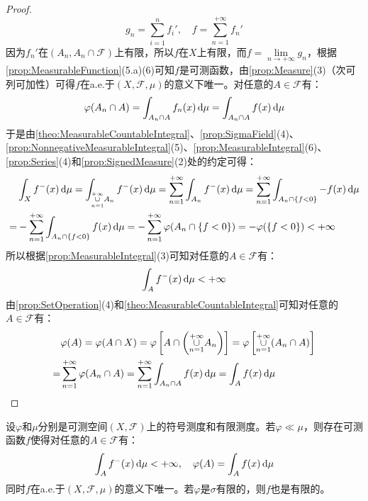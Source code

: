\begin{proof}
\begin{equation*}
		g_n=\sum_{i=1}^{n}f_i',\quad f=\sum_{n=1}^{+\infty}f_n'
	\end{equation*}
	因为$f_n'$在$(A_n,A_n\cap\mathscr{F})$上有限，所以$f$在$X$上有限，而$f=\lim\limits_{n\to+\infty}g_n$，根据\cref{prop:MeasurableFunction}(5.a)(6)可知$f$是可测函数，由\cref{prop:Measure}(3)（次可列可加性）可得$f$在a.e.于$(X,\mathscr{F},\mu)$的意义下唯一。对任意的$A\in\mathscr{F}$有：
	\begin{equation*}
		\varphi(A_n\cap A)=\int_{A_n\cap A}f_n(x)\mathop{}\!\mathrm{d}\mu=\int_{A_n\cap A}f(x)\mathop{}\!\mathrm{d}\mu
	\end{equation*}
	于是由\cref{theo:MeasurableCountableIntegral}、\cref{prop:SigmaField}(4)、\cref{prop:NonnegativeMeasurableIntegral}(5)、\cref{prop:MeasurableIntegral}(6)、\cref{prop:Series}(4)和\cref{prop:SignedMeasure}(2)处的约定可得：
	\begin{align*}
		&\int_{X}f^-(x)\mathop{}\!\mathrm{d}\mu=\int_{\underset{n=1}{\overset{+\infty}{\cup}}A_n}f^-(x)\mathop{}\!\mathrm{d}\mu=\sum_{n=1}^{+\infty}\int_{A_n}f^-(x)\mathop{}\!\mathrm{d}\mu=\sum_{n=1}^{+\infty}\int_{A_n\cap\{f<0\}}-f(x)\mathop{}\!\mathrm{d}\mu \\
		=&-\sum_{n=1}^{+\infty}\int_{A_n\cap\{f<0\}}f(x)\mathop{}\!\mathrm{d}\mu=-\sum_{n=1}^{+\infty}\varphi(A_n\cap\{f<0\})=-\varphi(\{f<0\})<+\infty
	\end{align*}
	所以根据\cref{prop:MeasurableIntegral}(3)可知对任意的$A\in\mathscr{F}$有：
	\begin{equation*}
		\int_{A}f^-(x)\mathop{}\!\mathrm{d}\mu<+\infty
	\end{equation*}
	由\cref{prop:SetOperation}(4)和\cref{theo:MeasurableCountableIntegral}可知对任意的$A\in\mathscr{F}$有：
	\begin{align*}
		&\varphi(A)=\varphi(A\cap X)=\varphi\left[A\cap\left(\underset{n=1}{\overset{+\infty}{\cup}}A_n\right)\right]=\varphi\left[\underset{n=1}{\overset{+\infty}{\cup}}(A_n\cap A)\right] \\
		=&\sum_{n=1}^{+\infty}\varphi(A_n\cap A)=\sum_{n=1}^{+\infty}\int_{A_n\cap A}f(x)\mathop{}\!\mathrm{d}\mu=\int_{A}f(x)\mathop{}\!\mathrm{d}\mu\qedhere
	\end{align*}
\end{proof}
\begin{lemma}\label{lem:RadonNikodym4}
	设$\varphi$和$\mu$分别是可测空间$(X,\mathscr{F})$上的符号测度和有限测度。若$\varphi\ll\mu$，则存在可测函数$f$使得对任意的$A\in\mathscr{F}$有：
	\begin{equation*}
		\int_{A}f^-(x)\mathop{}\!\mathrm{d}\mu<+\infty,\quad\varphi(A)=\int_{A}f(x)\mathop{}\!\mathrm{d}\mu
	\end{equation*}
	同时$f$在a.e.于$(X,\mathscr{F},\mu)$的意义下唯一。若$\varphi$是$\sigma$有限的，则$f$也是有限的。
\end{lemma}
